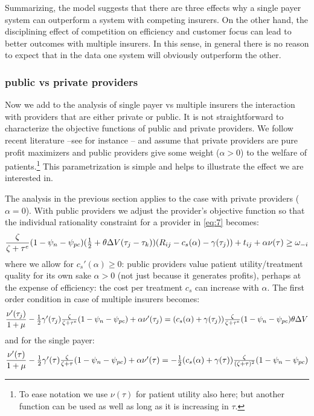 \documentclass[a4paper,12pt]{article}
\begin{document}
Summarizing, the model suggests that there are three effects why a single payer system can outperform a system with competing insurers. On the other hand, the disciplining effect of competition on efficiency and customer focus can lead to better outcomes with multiple insurers. In this sense, in general there is no reason to expect that in the data one system will obviously outperform the other.

\subsubsection{public vs private providers}
\label{sec:orga608659}

Now we add to the analysis of single payer vs multiple insurers the interaction with providers that are either private or public. It is not straightforward to characterize the objective functions of public and private providers. We follow recent literature --see for instance \cite{Brekke2018}-- and assume that private providers are pure profit maximizers and public providers give some weight (\(\alpha > 0\)) to the welfare of patients.\footnote{To ease notation we use \(\nu(\tau)\) for patient utility also here; but another function can be used as well as long as it is increasing in \(\tau\).} This parametrization is simple and helps to illustrate the effect we are interested in.

The analysis in the previous section applies to the case with private providers (\(\alpha=0\)). With public providers we adjust the provider's objective function so that the individual rationality constraint for a provider in \eqref{eq:7} becomes:
\begin{equation}
\label{eq:7a}
\frac{\zeta}{\zeta+\tau^e}(1-\psi_n-\psi_{pc})( \textstyle{1\over 2} + \theta \Delta V (\tau_j - \tau_k))(R_{ij}-c_s(\alpha)-\gamma(\tau_j) ) + t_{ij} + \alpha \nu(\tau) \geq \omega_{-i}
\end{equation}
where we allow for \(c_s'(\alpha) \geq 0\): public providers value patient utility/treatment quality for its own sake \(\alpha>0\) (not just because it generates profits), perhaps at the expense of efficiency: the cost per treatment \(c_s\) can increase with \(\alpha\). The first order condition in case of multiple insurers becomes:
\begin{equation}
\label{eq:37public} 
\frac{\nu'(\tau_j)}{1+\mu} - \textstyle{1\over 2} \gamma'(\tau_j) \frac{\zeta}{\zeta+\tau^e}(1-\psi_n-\psi_{pc}) + \alpha \nu'(\tau_j) = (c_s(\alpha)+\gamma(\tau_j)) \frac{\zeta}{\zeta+\tau^e} (1-\psi_n -\psi_{pc})\theta \Delta V
\end{equation}
and for the single payer:
\begin{equation}
\label{eq:37SPpublic}
 \frac{\nu'(\tau)}{1+\mu} - \textstyle{1\over 2} \gamma'(\tau) \frac{\zeta}{\zeta+\tau}(1-\psi_n-\psi_{pc}) + \alpha \nu'(\tau) = - \textstyle{1\over 2}(c_s(\alpha)+\gamma( \tau)) \frac{\zeta}{(\zeta+\tau)^2} (1-\psi_n -\psi_{pc})
\end{equation}
\end{document}
